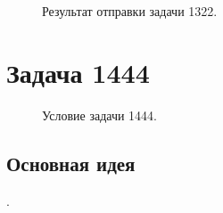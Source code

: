\documentclass[a5paper, 10pt]{article}
\theoremstyle{definition}
\theoremstyle{plain}
\theoremstyle{remark}
\begin{document}
\begin{figure}[h]
\caption{Результат отправки задачи 1322.}
\end{figure}



\newpage
\section{Задача 1444}

\begin{figure}[h]
\caption{Условие задачи 1444.}
\end{figure}

\subsection{Основная идея}
.
\end{document}
